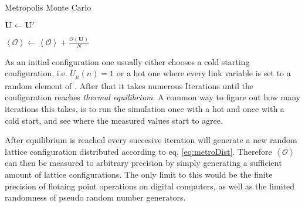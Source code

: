 \begin{algorithm}[!htb]
 \caption{Metropolis Monte Carlo}
 \label{alg:metroMonte}
 \begin{algorithmic}[1]
  \STATE {}

  \STATE {}
  \STATE {}
  \label{code:metroMonteIfCond}
  \STATE {}
  \STATE $\boldsymbol{U} \leftarrow \boldsymbol{U}'$
  \ENDIF

  \ENDFOR
  \STATE $\left\langle \mathcal{O} \right\rangle \leftarrow \left\langle \mathcal{O} \right\rangle + \frac{\mathcal{O}(\boldsymbol{U})}{N} $
  \ENDFOR
 \end{algorithmic}
\end{algorithm}
As an initial configuration one usually either chooses a cold starting configuration, i.e. $U_\mu(n)=1$ or a hot one where every link variable is set to a random element of \SUTwo. After that it takes numerous Iterations until the configuration reaches \emph{thermal equilibrium}. A common way to figure out how many iterations this takes, is to run the simulation once with a hot and once with a cold start, and see where the measured values start to agree.

After equilibrium is reached every succesive iteration will generate a new random lattice configuration distributed according to eq. \ref{eq:metroDist}. Therefore $\left\langle \mathcal{O} \right\rangle$ can then be measured to arbitrary precision by simply generating a sufficient amount of lattice configurations. The only limit to this would be the finite precision of flotaing point operations on digital computers, as well as the limited randomness of pseudo random number generators.

